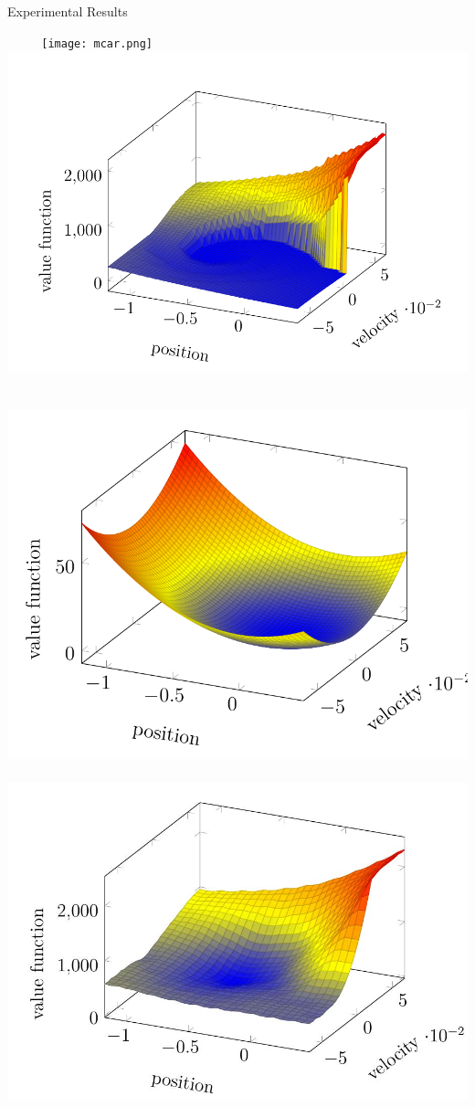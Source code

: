 \documentclass[10pt,handout]{beamer}
\begin{document}
\begin{frame}{Experimental Results}
\begin{block}{}
$\mbox{ }$
$\mbox{ }$$\mbox{ }$
\texttt{[image: mcar.png]}
$\mbox{ }$
\includegraphics[scale=0.21]{actval.jpeg}\\
$\mbox{ }$\\
$\mbox{ }$
\includegraphics[scale=0.21]{basisval.jpeg}
$\mbox{ }$
\includegraphics[scale=0.19]{appval.jpeg}
\end{block}
\end{frame}
\end{document}
